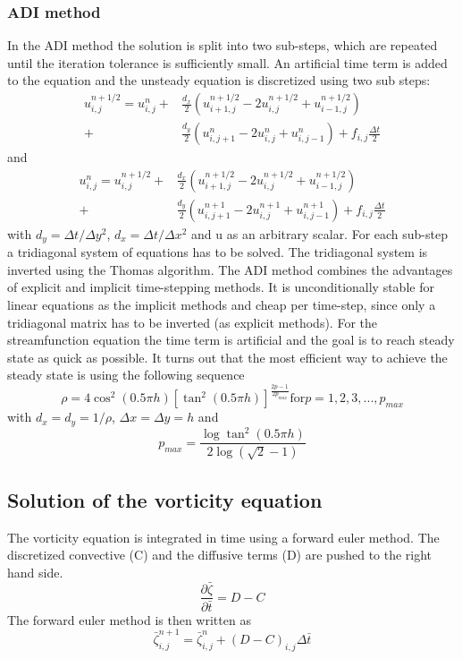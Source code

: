 \subsubsection{ADI method}
%
In the ADI method the solution is split into two sub-steps, which are repeated until the iteration tolerance is sufficiently small. An artificial time term is added to the equation and the unsteady equation is discretized using two sub steps:
\begin{eqnarray}
u_{i,j}^{n+1/2} = u^n_{i,j} + &\frac{d_x}{2}\left(u^{n+1/2}_{i+1,j} - 2 u^{n+1/2}_{i,j} + u^{n+1/2}_{i-1,j}\right) \\
 +& \frac{d_y}{2}\left(u^n_{i,j+1} - 2 u^n_{i,j} + u^n_{i,j-1} \right) + f_{i,j} \frac{\Delta t}{2} 
\end{eqnarray}
and 
\begin{eqnarray}
u_{i,j}^{n} = u^{n+1/2}_{i,j} +& \frac{d_x}{2}\left(u^{n+1/2}_{i+1,j} - 2 u^{n+1/2}_{i,j} + u^{n+1/2}_{i-1,j}\right) \\
+ &\frac{d_y}{2}\left(u^{n+1}_{i,j+1} - 2 u^{n+1}_{i,j} + u^{n+1}_{i,j-1} \right) + f_{i,j} \frac{\Delta t}{2} 
\end{eqnarray} 
with $d_y=\Delta t/\Delta y^2$,  $d_x=\Delta t/\Delta x^2$ and u as an arbitrary scalar. For each sub-step a tridiagonal system of equations has to be solved. The tridiagonal system is inverted using the Thomas algorithm. The ADI method combines the advantages of explicit and implicit time-stepping methods. It is  unconditionally stable for linear equations  as the implicit methods and cheap per time-step, since only a tridiagonal matrix has to be inverted (as explicit methods). For the streamfunction equation the time term is artificial and the goal is to reach steady state as quick as possible. It turns out that the most efficient way to achieve the steady state is using the following sequence
\begin{equation}
\rho = 4 \cos^2(0.5\pi h) \left[\tan^2(0.5\pi h)\right]^{\frac{2p-1}{2p_{max}}} \mathrm{for } p=1,2,3,...,p_{max}  
\end{equation} 
with $d_x=d_y=1/\rho$, $\Delta x = \Delta y = h$ and
\begin{equation}
p_{max} = \frac{\log \tan^2(0.5\pi h)}{2\log(\sqrt{2}-1)}
\end{equation} 
\subsection{Solution of the vorticity equation}
The vorticity equation is integrated in time using a forward euler method. The discretized convective (C) and the diffusive terms (D) are pushed to the right hand side. 
\begin{equation}
\frac{\partial \bar{\zeta}}{\partial \bar{t}} = D-C
\end{equation}
The forward euler method is then written as
\begin{equation}
\bar{\zeta}^{n+1}_{i,j} = \bar{\zeta}^{n}_{i,j} + (D-C)_{i,j} \Delta \bar{t}
\end{equation}
